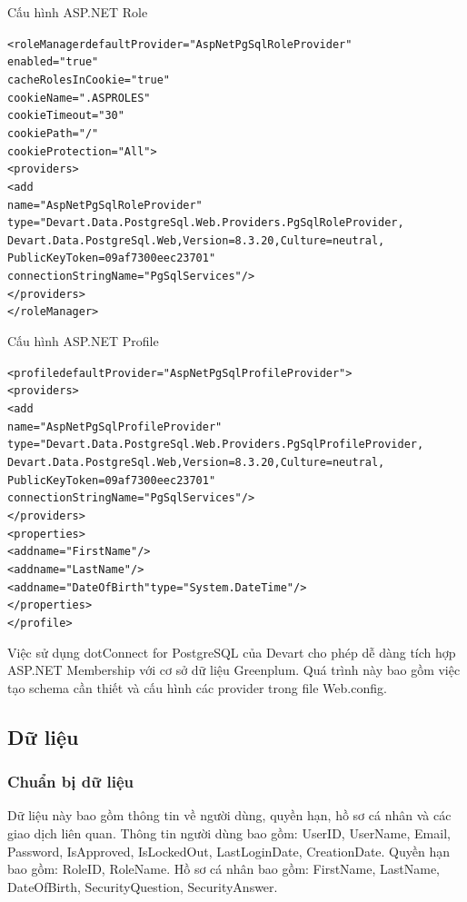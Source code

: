 \documentclass[14pt]{article}
\begin{document}
Cấu hình ASP.NET Role
\begin{mdframed}[backgroundcolor=white, linecolor=black, roundcorner=5pt]
\begin{alltt}
<roleManager defaultProvider="AspNetPgSqlRoleProvider"
             enabled="true"
             cacheRolesInCookie="true"
             cookieName=".ASPROLES"
             cookieTimeout="30"
             cookiePath="/"
             cookieProtection="All">
  <providers>
    <add
      name="AspNetPgSqlRoleProvider"
      type="Devart.Data.PostgreSql.Web.Providers.PgSqlRoleProvider,
            Devart.Data.PostgreSql.Web, Version=8.3.20, Culture=neutral,
            PublicKeyToken=09af7300eec23701"
      connectionStringName="PgSqlServices" />
  </providers>
</roleManager>
\end{alltt}
\end{mdframed}

Cấu hình ASP.NET Profile 
\begin{mdframed}[backgroundcolor=white, linecolor=black, roundcorner=5pt]
\begin{alltt}
<profile defaultProvider="AspNetPgSqlProfileProvider">
  <providers>
    <add
      name="AspNetPgSqlProfileProvider"
      type="Devart.Data.PostgreSql.Web.Providers.PgSqlProfileProvider,
            Devart.Data.PostgreSql.Web, Version=8.3.20, Culture=neutral,
            PublicKeyToken=09af7300eec23701"
      connectionStringName="PgSqlServices" />
  </providers>
  <properties>
    <add name="FirstName" />
    <add name="LastName" />
    <add name="DateOfBirth" type="System.DateTime"/>
  </properties>
</profile>
\end{alltt}
\end{mdframed}

Việc sử dụng dotConnect for PostgreSQL của Devart cho phép dễ dàng tích hợp ASP.NET Membership với cơ sở dữ liệu Greenplum. Quá trình này bao gồm việc tạo schema cần thiết và cấu hình các provider trong file Web.config.


\subsection{Dữ liệu}

\subsubsection{Chuẩn bị dữ liệu}

Dữ liệu này bao gồm thông tin về người dùng, quyền hạn, hồ sơ cá nhân và các giao dịch liên quan. Thông tin người dùng bao gồm: UserID, UserName, Email, Password, IsApproved, IsLockedOut, LastLoginDate, CreationDate. Quyền hạn bao gồm: RoleID, RoleName. Hồ sơ cá nhân bao gồm: FirstName, LastName, DateOfBirth, SecurityQuestion, SecurityAnswer.
\end{document}
